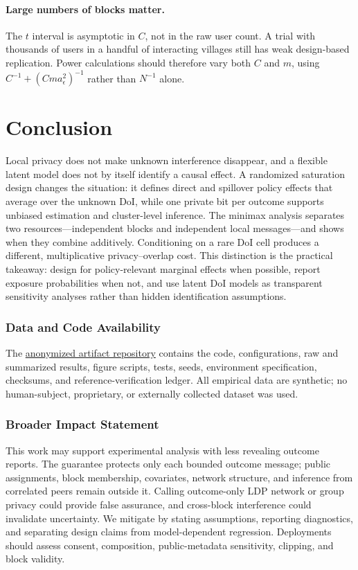 \documentclass[10pt]{article}
\theoremstyle{definition}
\theoremstyle{remark}
\newcommand{\doisig}{a_{\epsilon}}
\begin{document}
\paragraph{Large numbers of blocks matter.}
The $t$ interval is asymptotic in $C$, not in the raw user count. A trial with thousands of
users in a handful of interacting villages still has weak design-based replication. Power
calculations should therefore vary both $C$ and $m$, using
$C^{-1}+(Cm\doisig^2)^{-1}$ rather than $N^{-1}$ alone.

\section{Conclusion}

Local privacy does not make unknown interference disappear, and a flexible latent model does
not by itself identify a causal effect. A randomized saturation design changes the situation:
it defines direct and spillover policy effects that average over the unknown DoI, while one
private bit per outcome supports unbiased estimation and cluster-level inference. The minimax
analysis separates two resources---independent blocks and independent local messages---and
shows when they combine additively. Conditioning on a rare DoI cell produces a different,
multiplicative privacy--overlap cost. This distinction is the practical takeaway: design for
policy-relevant marginal effects when possible, report exposure probabilities when not, and use
latent DoI models as transparent sensitivity analyses rather than hidden identification
assumptions.

\subsubsection*{Data and Code Availability}

The \href{https://anonymous.4open.science/r/locally-private-unknown-interference-7BE9}{anonymized
artifact repository} contains the code, configurations, raw and summarized results, figure
scripts, tests, seeds, environment specification, checksums, and reference-verification ledger.
All empirical data are synthetic; no human-subject, proprietary, or externally collected
dataset was used.

\subsubsection*{Broader Impact Statement}

This work may support experimental analysis with less revealing outcome reports. The guarantee
protects only each bounded outcome message; public assignments, block membership, covariates,
network structure, and inference from correlated peers remain outside it. Calling outcome-only
LDP network or group privacy could provide false assurance, and cross-block interference could
invalidate uncertainty. We mitigate by stating assumptions, reporting diagnostics, and
separating design claims from model-dependent regression. Deployments should assess consent,
composition, public-metadata sensitivity, clipping, and block validity.
\end{document}

